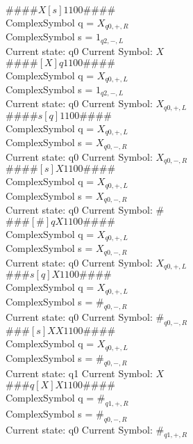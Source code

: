 \documentclass[10pt, a4paper]{article}
\begin{document}
$\# \#\# \# X [ s ] 1 1 0 0 \# \# \# \# $ \\
ComplexSymbol q = $X_{q0,+,R}$ \\
ComplexSymbol s = $1_{q2,-,L}$ \\ 
 \medskip
Current state: q0	 Current Symbol: 	 $X$\\
$\# \#\# \# [ X ] q 1 1 0 0 \# \# \# \# $ \\
ComplexSymbol q = $X_{q0,+,L}$ \\
ComplexSymbol s = $1_{q2,-,L}$ \\ 
 \medskip
Current state: q0	 Current Symbol: 	 $X_{q0,+,L}$\\
$\# \#\# \# s [ q ] 1 1 0 0 \# \# \# \# $ \\
ComplexSymbol q = $X_{q0,+,L}$ \\
ComplexSymbol s = $X_{q0,-,R}$ \\ 
 \medskip
Current state: q0	 Current Symbol: 	 $X_{q0,-,R}$\\
$\# \#\# \# [ s ] X 1 1 0 0 \# \# \# \# $ \\
ComplexSymbol q = $X_{q0,+,L}$ \\
ComplexSymbol s = $X_{q0,-,R}$ \\ 
 \medskip
Current state: q0	 Current Symbol: 	 $\#$\\
$\# \#\# [ \# ] q X 1 1 0 0 \# \# \# \# $ \\
ComplexSymbol q = $X_{q0,+,L}$ \\
ComplexSymbol s = $X_{q0,-,R}$ \\ 
 \medskip
Current state: q0	 Current Symbol: 	 $X_{q0,+,L}$\\
$\# \#\# s [ q ] X 1 1 0 0 \# \# \# \# $ \\
ComplexSymbol q = $X_{q0,+,L}$ \\
ComplexSymbol s = $\#_{q0,-,R}$ \\ 
 \medskip
Current state: q0	 Current Symbol: 	 $\#_{q0,-,R}$\\
$\# \#\# [ s ] X X 1 1 0 0 \# \# \# \# $ \\
ComplexSymbol q = $X_{q0,+,L}$ \\
ComplexSymbol s = $\#_{q0,-,R}$ \\ 
 \medskip
Current state: q1	 Current Symbol: 	 $X$\\
$\# \#\# q [ X ] X 1 1 0 0 \# \# \# \# $ \\
ComplexSymbol q = $\#_{q1,+,R}$ \\
ComplexSymbol s = $\#_{q0,-,R}$ \\ 
 \medskip
Current state: q0	 Current Symbol: 	 $\#_{q1,+,R}$\\
\end{document}
